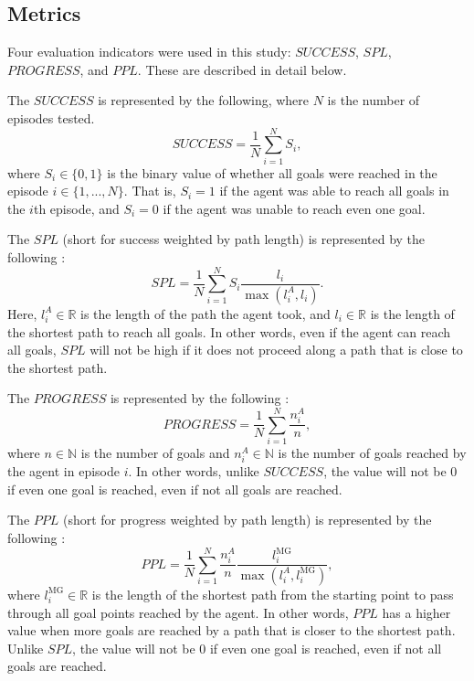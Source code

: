 \subsection{Metrics}


Four evaluation indicators were used in this study: $SUCCESS$, $SPL$, $PROGRESS$, and $PPL$.
These are described in detail below.

The $SUCCESS$ is represented by the following, where $N$ is the number of episodes tested.
\[
SUCCESS = \frac{1}{N} \sum_{i = 1}^N S_i,
\]
where $S_i \in \{0, 1\}$ is the binary value of whether all goals were reached in the episode $i \in \{1, ..., N\}$.
That is, $S_i = 1$ if the agent was able to reach all goals in the $i$th episode, and $S_i = 0$ if the agent was unable to reach even one goal.

The $SPL$ (short for success weighted by path length) is represented by the following \cite{anderson2018evaluation}:
\[
SPL = \frac{1}{N} \sum_{i = 1}^N S_i \frac{l_i}{\max(l^A_i, l_i)}.
\]
Here, $l^A_i \in \mathbb{R}$ is the length of the path the agent took, and $l_i \in \mathbb{R}$ is the length of the shortest path to reach all goals.
In other words, even if the agent can reach all goals, $SPL$ will not be high if it does not proceed along a path that is close to the shortest path.

The $PROGRESS$ is represented by the following \cite{wani2020multion}:
\[
PROGRESS = \frac{1}{N} \sum_{i = 1}^N \frac{n^A_i}{n},
\]
where $n \in \mathbb{N}$ is the number of goals and $n^A_i \in \mathbb{N}$ is the number of goals reached by the agent in episode $i$.
In other words, unlike $SUCCESS$, the value will not be $0$ if even one goal is reached, even if not all goals are reached.

The $PPL$ (short for progress weighted by path length) is represented by the following \cite{wani2020multion}:
\[
PPL = \frac{1}{N} \sum_{i = 1}^N \frac{n^A_i}{n} \frac{l^\mathrm{MG}_i}{\max(l^A_i, l^\mathrm{MG}_i)},
\]
where $l^\mathrm{MG}_i \in \mathbb{R}$ is the length of the shortest path from the starting point to pass through all goal points reached by the agent.
In other words, $PPL$ has a higher value when more goals are reached by a path that is closer to the shortest path.
Unlike $SPL$, the value will not be $0$ if even one goal is reached, even if not all goals are reached.

